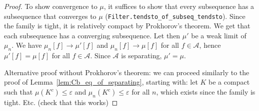 \begin{proof}
To show convergence to $\mu$, it suffices to show that every subsequence has a subsequence that converges to $\mu$ (\texttt{Filter.tendsto\_of\_subseq\_tendsto}).
Since the family is tight, it is relatively compact by Prokhorov's theorem. We get that each subsequence has a converging subsequence.
Let then $\mu'$ be a weak limit of $\mu_n$. We have $\mu_n[f] \to \mu'[f]$ and $\mu_n[f] \to \mu[f]$ for all $f \in \mathcal A$, hence $\mu'[f] = \mu[f]$ for all $f \in \mathcal A$. Since $\mathcal A$ is separating, $\mathcal \mu' = \mu$.

Alternative proof without Prokhorov's theorem: we can proceed similarly to the proof of Lemma~\ref{lem:Cb_eq_of_separating}, starting with: let $K$ be a compact such that $\mu(K^c) \le \varepsilon$ and $\mu_n(K^c) \le \varepsilon$ for all $n$, which exists since the family is tight. Etc. (check that this works)
\end{proof}
